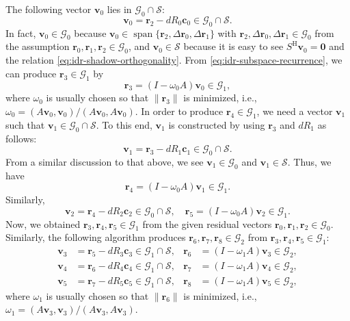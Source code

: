 {The following vector $\bm v_0$ lies in $\mathcal G_0\cap\mathcal S$:}
\begin{equation}\label{eq:idr-first-projected-vector}\bm v_0=\bm r_2-dR_0\bm c_0\in\mathcal G_0\cap\mathcal S.\end{equation}
{In fact, $\bm v_0\in\mathcal G_0$ because $\bm v_0\in\operatorname{span}\{\bm r_2,\Delta\bm r_0,\Delta\bm r_1\}$ with $\bm r_2,\Delta\bm r_0,\Delta\bm r_1\in\mathcal G_0$ from the assumption $\bm r_0,\bm r_1,\bm r_2\in\mathcal G_0$, and $\bm v_0\in\mathcal S$ because it is easy to see $S^{\mathrm H}\bm v_0=\bm0$ and the relation \eqref{eq:idr-shadow-orthogonality}.}
{From \eqref{eq:idr-subspace-recurrence}, we can produce $\bm r_3\in\mathcal G_1$ by}
\begin{equation}\label{eq:idr-first-reduced-residual}\bm r_3=(I-\omega_0A)\bm v_0\in\mathcal G_1,\end{equation}
{where $\omega_0$ is usually chosen so that $\|\bm r_3\|$ is minimized, i.e., $\omega_0=(A\bm v_0,\bm v_0)/(A\bm v_0,A\bm v_0)$.}
{In order to produce $\bm r_4\in\mathcal G_1$, we need a vector $\bm v_1$ such that $\bm v_1\in\mathcal G_0\cap\mathcal S$. To this end, $\bm v_1$ is constructed by using $\bm r_3$ and $dR_1$ as follows:}
\[\bm v_1=\bm r_3-dR_1\bm c_1\in\mathcal G_0\cap\mathcal S.\]
{From a similar discussion to that above, we see $\bm v_1\in\mathcal G_0$ and $\bm v_1\in\mathcal S$. Thus, we have}
\[\bm r_4=(I-\omega_0A)\bm v_1\in\mathcal G_1.\]
{Similarly,}
\[\bm v_2=\bm r_4-dR_2\bm c_2\in\mathcal G_0\cap\mathcal S,\quad\bm r_5=(I-\omega_0A)\bm v_2\in\mathcal G_1.\]
{Now, we obtained $\bm r_3,\bm r_4,\bm r_5\in\mathcal G_1$ from the given residual vectors $\bm r_0,\bm r_1,\bm r_2\in\mathcal G_0$. Similarly, the following algorithm produces $\bm r_6,\bm r_7,\bm r_8\in\mathcal G_2$ from $\bm r_3,\bm r_4,\bm r_5\in\mathcal G_1$:}
\[\begin{aligned}\bm v_3&=\bm r_5-dR_3\bm c_3\in\mathcal G_1\cap\mathcal S,&\bm r_6&=(I-\omega_1A)\bm v_3\in\mathcal G_2,\\\bm v_4&=\bm r_6-dR_4\bm c_4\in\mathcal G_1\cap\mathcal S,&\bm r_7&=(I-\omega_1A)\bm v_4\in\mathcal G_2,\\\bm v_5&=\bm r_7-dR_5\bm c_5\in\mathcal G_1\cap\mathcal S,&\bm r_8&=(I-\omega_1A)\bm v_5\in\mathcal G_2,\end{aligned}\]
{where $\omega_1$ is usually chosen so that $\|\bm r_6\|$ is minimized, i.e., $\omega_1=(A\bm v_3,\bm v_3)/(A\bm v_3,A\bm v_3)$.}
